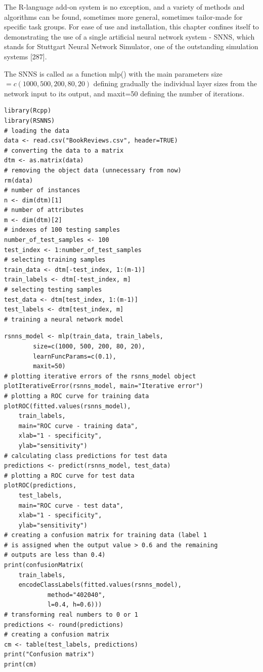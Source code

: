 \documentclass[10pt]{book}
\begin{document}
The R-language add-on system is no exception, and a variety of methods and algorithms can be found, sometimes more general, sometimes tailor-made for specific task groups. For ease of use and installation, this chapter confines itself to demonstrating the use of a single artificial neural network system - SNNS, which stands for Stuttgart Neural Network Simulator, one of the outstanding simulation systems [287].

The SNNS is called as a function mlp() with the main parameters size $=c(1000,500,200,80,20)$ defining gradually the individual layer sizes from the network input to its output, and maxit=50 defining the number of iterations.

\begin{verbatim}
library(Rcpp)
library(RSNNS)
# loading the data
data <- read.csv("BookReviews.csv", header=TRUE)
# converting the data to a matrix
dtm <- as.matrix(data)
# removing the object data (unnecessary from now)
rm(data)
# number of instances
n <- dim(dtm)[1]
# number of attributes
m <- dim(dtm)[2]
# indexes of 100 testing samples
number_of_test_samples <- 100
test_index <- 1:number_of_test_samples
# selecting training samples
train_data <- dtm[-test_index, 1:(m-1)]
train_labels <- dtm[-test_index, m]
# selecting testing samples
test_data <- dtm[test_index, 1:(m-1)]
test_labels <- dtm[test_index, m]
# training a neural network model
\end{verbatim}

\begin{verbatim}
rsnns_model <- mlp(train_data, train_labels,
        size=c(1000, 500, 200, 80, 20),
        learnFuncParams=c(0.1),
        maxit=50)
# plotting iterative errors of the rsnns_model object
plotIterativeError(rsnns_model, main="Iterative error")
# plotting a ROC curve for training data
plotROC(fitted.values(rsnns_model),
    train_labels,
    main="ROC curve - training data",
    xlab="1 - specificity",
    ylab="sensitivity")
# calculating class predictions for test data
predictions <- predict(rsnns_model, test_data)
# plotting a ROC curve for test data
plotROC(predictions,
    test_labels,
    main="ROC curve - test data",
    xlab="1 - specificity",
    ylab="sensitivity")
# creating a confusion matrix for training data (label 1
# is assigned when the output value > 0.6 and the remaining
# outputs are less than 0.4)
print(confusionMatrix(
    train_labels,
    encodeClassLabels(fitted.values(rsnns_model),
            method="402040",
            l=0.4, h=0.6)))
# transforming real numbers to 0 or 1
predictions <- round(predictions)
# creating a confusion matrix
cm <- table(test_labels, predictions)
print("Confusion matrix")
print(cm)
\end{verbatim}
\end{document}
